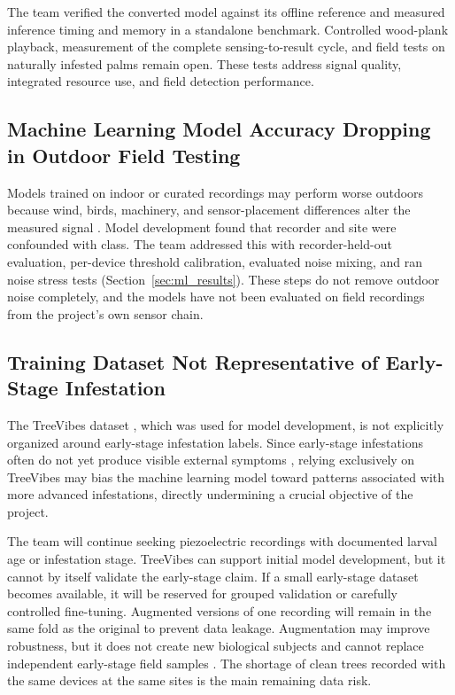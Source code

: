 \documentclass[12pt,a4paper,oneside]{memoir}
\newcommand{\newrevision}[1]{#1}
\begin{document}
\newrevision{The team verified the converted model against its offline reference and measured inference timing and memory in a standalone benchmark. Controlled wood-plank playback, measurement of the complete sensing-to-result cycle, and field tests on naturally infested palms remain open. These tests address signal quality, integrated resource use, and field detection performance.}

\subsection{Machine Learning Model Accuracy Dropping in Outdoor Field Testing}

Models trained on indoor or curated recordings may perform worse outdoors because wind, birds, machinery, and sensor-placement differences alter the measured signal \cite{pinhas2008,rach2013,ashry2022cnn}. \newrevision{Model development found that recorder and site were confounded with class. The team addressed this with recorder-held-out evaluation, per-device threshold calibration, evaluated noise mixing, and ran noise stress tests (Section~\ref{sec:ml_results}). These steps do not remove outdoor noise completely, and the models have not been evaluated on field recordings from the project's own sensor chain.}

\subsection{Training Dataset Not Representative of Early-Stage Infestation}

The TreeVibes dataset \cite{rigakis2021}, which was used for model development, is not explicitly organized around early-stage infestation labels. Since early-stage infestations often do not yet produce visible external symptoms \cite{pinhas2008,sutanto2023}, relying exclusively on TreeVibes may bias the machine learning model toward patterns associated with more advanced infestations, directly undermining a crucial objective of the project.

The team will continue seeking piezoelectric recordings with documented larval age or infestation stage. TreeVibes can support initial model development, but it cannot by itself validate the early-stage claim. If a small early-stage dataset becomes available, it will be reserved for grouped validation or carefully controlled fine-tuning. Augmented versions of one recording will remain in the same fold as the original to prevent data leakage. Augmentation may improve robustness, but it does not create new biological subjects and cannot replace independent early-stage field samples \cite{rezaul2024,turskis}. \newrevision{The shortage of clean trees recorded with the same devices at the same sites is the main remaining data risk.}
\end{document}
